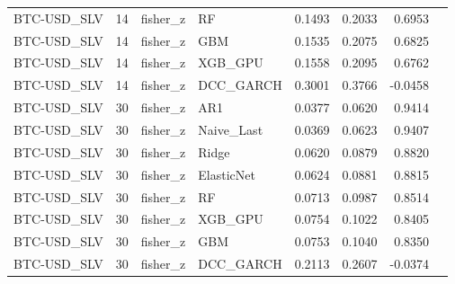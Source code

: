 \begin{table}[H]
\begin{tabular}{llllrrrr}
BTC-USD_SLV & 14 & fisher_z & RF & 0.1493 & 0.2033 & 0.6953 &  \\
BTC-USD_SLV & 14 & fisher_z & GBM & 0.1535 & 0.2075 & 0.6825 &  \\
BTC-USD_SLV & 14 & fisher_z & XGB_GPU & 0.1558 & 0.2095 & 0.6762 &  \\
BTC-USD_SLV & 14 & fisher_z & DCC_GARCH & 0.3001 & 0.3766 & -0.0458 &  \\
BTC-USD_SLV & 30 & fisher_z & AR1 & 0.0377 & 0.0620 & 0.9414 &  \\
BTC-USD_SLV & 30 & fisher_z & Naive_Last & 0.0369 & 0.0623 & 0.9407 &  \\
BTC-USD_SLV & 30 & fisher_z & Ridge & 0.0620 & 0.0879 & 0.8820 &  \\
BTC-USD_SLV & 30 & fisher_z & ElasticNet & 0.0624 & 0.0881 & 0.8815 &  \\
BTC-USD_SLV & 30 & fisher_z & RF & 0.0713 & 0.0987 & 0.8514 &  \\
BTC-USD_SLV & 30 & fisher_z & XGB_GPU & 0.0754 & 0.1022 & 0.8405 &  \\
BTC-USD_SLV & 30 & fisher_z & GBM & 0.0753 & 0.1040 & 0.8350 &  \\
BTC-USD_SLV & 30 & fisher_z & DCC_GARCH & 0.2113 & 0.2607 & -0.0374 &  \\
\bottomrule
\end{tabular}
\end{table}